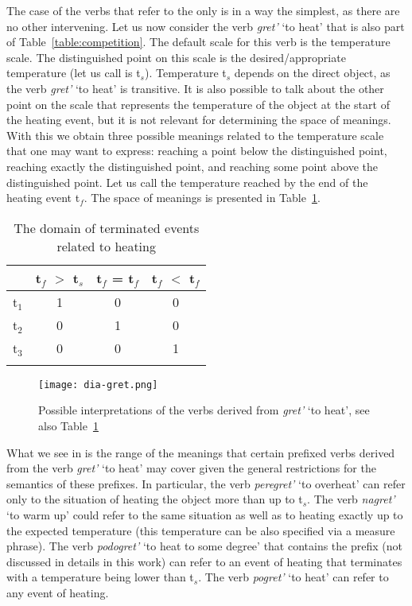 The case of the verbs that refer to the  only is in a way the simplest, as there are no other  intervening. Let us now consider the verb \textit{gret'} `to heat' that is also part of Table~\ref{table:competition}. The default scale for this verb is the temperature scale. The distinguished point on this scale is the desired/appropriate temperature (let us call is t$_s$). Temperature t$_s$ depends on the direct object, as the verb \textit{gret'} `to heat' is transitive. It is also possible to talk about the other point on the scale that represents the temperature of the object at the start of the heating event, but it is not relevant for determining the space of meanings. With this we obtain three possible meanings related to the temperature scale that one may want to express: reaching a point below the distinguished point, reaching exactly the distinguished point, and reaching some point above the distinguished point. Let us call the temperature reached by the end of the heating event t$_f$. The space of meanings is presented in Table~\ref{table:gret}.

\begin{table}
\caption{The domain of terminated events related to heating \label{table:gret}}
\begin{tabular}{lccc}
\lsptoprule
 & t$_f$ $>$ t$_s$ & t$_f$ = t$_f$ & t$_f$ $<$ t$_f$\\
\midrule
t$_1$ & 1 & 0 & 0\\
t$_2$ & 0 & 1 & 0\\
t$_3$ & 0 & 0 & 1\\
\lspbottomrule
\end{tabular}
\end{table}

\begin{figure}
\centering
\texttt{[image: dia-gret.png]}
\caption{Possible interpretations of the verbs derived from \textit{gret'} `to heat', see also Table~\ref{table:gret} \label{fig:gret}}
\end{figure}

What we see in  is the range of the meanings that certain prefixed verbs derived from the verb \textit{gret'} `to heat' may cover given the general restrictions for the semantics of these prefixes. In particular, the verb \textit{peregret'} `to overheat' can refer only to the situation of heating the object more than up to t$_s$. The verb \textit{nagret'} `to warm up' could refer to the same situation as well as to heating exactly up to the expected temperature (this temperature can be also specified via a measure phrase). The verb \textit{podogret'} `to heat to some degree' that contains the prefix  (not discussed in details in this work) can refer to an event of heating that terminates with a temperature being lower than t$_s$. The verb \textit{pogret'} `to heat' can refer to any event of heating.

